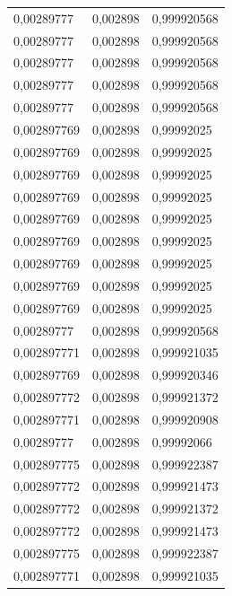 \begin{center}
\begin{longtable}{|l|l|l|}
0,00289777         & 0,002898              & 0,999920568  \\
0,00289777         & 0,002898              & 0,999920568  \\
0,00289777         & 0,002898              & 0,999920568  \\
0,00289777         & 0,002898              & 0,999920568  \\
0,00289777         & 0,002898              & 0,999920568  \\
0,002897769        & 0,002898              & 0,99992025   \\
0,002897769        & 0,002898              & 0,99992025   \\
0,002897769        & 0,002898              & 0,99992025   \\
0,002897769        & 0,002898              & 0,99992025   \\
0,002897769        & 0,002898              & 0,99992025   \\
0,002897769        & 0,002898              & 0,99992025   \\
0,002897769        & 0,002898              & 0,99992025   \\
0,002897769        & 0,002898              & 0,99992025   \\
0,002897769        & 0,002898              & 0,99992025   \\
0,00289777         & 0,002898              & 0,999920568  \\
0,002897771        & 0,002898              & 0,999921035  \\
0,002897769        & 0,002898              & 0,999920346  \\
0,002897772        & 0,002898              & 0,999921372  \\
0,002897771        & 0,002898              & 0,999920908  \\
0,00289777         & 0,002898              & 0,99992066   \\
0,002897775        & 0,002898              & 0,999922387  \\
0,002897772        & 0,002898              & 0,999921473  \\
0,002897772        & 0,002898              & 0,999921372  \\
0,002897772        & 0,002898              & 0,999921473  \\
0,002897775        & 0,002898              & 0,999922387  \\
0,002897771        & 0,002898              & 0,999921035  \\

\end{longtable}
\end{center}

